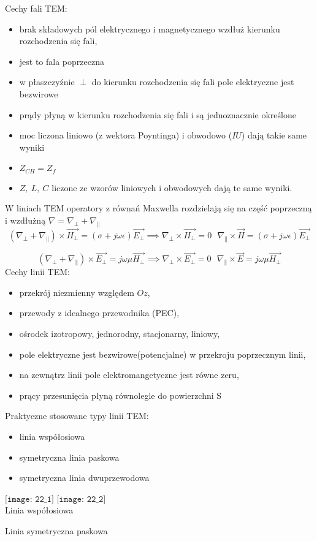 \begin{solution}
Cechy fali TEM:
\begin{itemize}
\item brak składowych pól elektrycznego i magnetycznego wzdłuż kierunku rozchodzenia się fali,
\item jest to fala poprzeczna
\item w płaszczyźnie $\perp $ do kierunku rozchodzenia się fali pole elektryczne jest bezwirowe
\item prądy płyną w kierunku rozchodzenia się fali i są jednoznacznie określone
\item moc liczona liniowo (z wektora Poyntinga) i obwodowo ($IU$) dają takie same wyniki
\item $Z_{CH}=Z_{f}$
\item $Z,\ L,\ C$ liczone ze wzorów liniowych i obwodowych dają te same wyniki.
\end{itemize}
W liniach TEM operatory z równań Maxwella rozdzielają się na część poprzeczną i wzdłużną $\nabla=\nabla_{\perp}+\nabla_{\parallel}$
$$(\nabla_{\perp}+\nabla_{\parallel})\times\vec{H_{\perp}}=(\sigma + j\omega\epsilon)\vec{E_{\perp}}
\implies \nabla_{\perp}\times\vec{H_{\perp}}=0 \ \ \ \nabla_{\parallel}\times\vec{H}=(\sigma+j\omega\epsilon)\vec{E_{\perp}}$$

$$(\nabla_{\perp}+\nabla_{\parallel})\times\vec{E_{\perp}}=j\omega\mu\vec{H_{\perp}}
\implies \nabla_{\perp}\times\vec{E_{\perp}}=0 \ \ \ \nabla_{\parallel}\times\vec{E}=j\omega\mu\vec{H_{\perp}}$$
Cechy linii TEM:
\begin{itemize}
\item przekrój niezmienny względem $Oz$,
\item przewody z idealnego przewodnika (PEC),
\item ośrodek izotropowy, jednorodny, stacjonarny, liniowy,
\item pole elektryczne jest bezwirowe(potencjalne) w przekroju poprzecznym linii,
\item na zewnątrz linii pole elektromangetyczne jest równe zeru,
\item prący przesunięcia płyną równolegle do powierzchni S
\end{itemize}

Praktyczne stosowane typy linii TEM:
\begin{itemize}
\item linia współosiowa
\item symetryczna linia paskowa
\item symetryczna linia dwuprzewodowa
\end{itemize}
	$\texttt{[image: 22\_1]}$  \quad \quad \quad    $\texttt{[image: 22\_2]}$\\
	\caption{Linia współosiowa}       \qquad \qquad \qquad  \caption{Linia symetryczna paskowa}\\


\end{solution}
